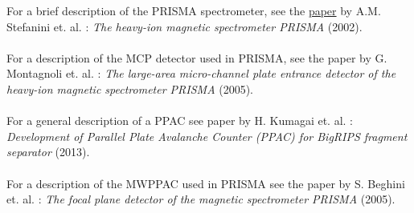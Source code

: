 \documentclass{article}
\begin{document}
For a brief description of the PRISMA spectrometer, see the \href{https://pdf.sciencedirectassets.com/271584/1-s2.0-S0375947400X03144/1-s2.0-S0375947401015780/main.pdf?X-Amz-Security-Token=IQoJb3JpZ2luX2VjEBUaCXVzLWVhc3QtMSJIMEYCIQCRHpLF752rX6FV98MG74Br%2FOwOBcpX6yD1ddcGS8dSogIhALw%2BCaK68OE4q%2F6Cdxw0tkpWl%2Bi4lobnjDAMbgD3WJloKrIFCC0QBRoMMDU5MDAzNTQ2ODY1IgwMev7XIuiKrEucM2sqjwWtmOVcx3R3%2Fmi1N0QLMzkty6y2NG4iTH21bMxPIwZ8bQsn8Kg3vHjRCiynMJC%2FlktTnzFi2XkxrC%2FoK4kKi%2B8iimicv2aD8Nizb2825kJ%2FRqL1m1CyxalJMwzkDry9N5s67QGkkBBkVpwSGUaqE9ItwMX9RaUYB8rbZ4XGQgEbEEu0ieJJsUB4r719gHyZT6a2tcA7tPByMY4yMQdYSN%2BLrS6zSPIlUyVI5xwpp6IhuzKl%2BAbTeT6MMobR4USSvpO%2F0%2B9YpoSX%2FPILnulAL%2BEsYUV5nnY0UikYVkB%2FqUPnuFdt0bYK7prGjl8hrlFYOe%2BEJAVweOPBvdNjb%2FevxjTkPbvHhbeIGwQr0UWRC490vEDlzcIyLTqbhdrktht9DyDgGyydHMcLBgPuKk321kQxElTUijRAq5cl690oxyiaUEAW1DqwuwTVrVn56VGNOgTP6Tg8S7UG1Xsq0cEgz8dGb%2FGoZxtboOTgIzU%2FUu2Fgd5c6yfxdH2R8E0gjw1wPRv08lcaxfDL4S6rQRE4PkDSoybPDlxQeOEnlgud1vEfQ0Q1%2BzXoMyX2lSVbcS%2BmIyILmRk1f2Q05tYbufg6wGWfHSuWsLw8sOQlAGYYItykkc0OuMKu7ljApViwZcxnK5TeHn9JUN6w1TPzD2yvjxGZvvvUNhjb1%2BGWOwVPTr2XInX3RVQ8TemjoR%2FpmnOUwujD7THjlAjoTGUKzBI8Zb27vahSWoXKNu9J3n6DuvJ8WzrRTwnVtasxmPX50%2FGHUu7sIF1jXeYDiBiBbohTO%2FU7mddA3iK6GXTZXzMUo9AVuC8agGHRfIKiwBCwX3WzQ%2Ba03XCQ4ZiiCfjGsNIizmDUEIpcuCpxp0DntsjbKxRSMN%2BMiL0GOrAB%2Fm%2BcgaLg9cWzCaB7oMuYF7AhoIX569krU7XbygoyOo1KAZnBHXgaKhUQn%2BO9d6Y5fMmHUvRYIx36AqFijMNCGNIWpD6Gd06up%2BGh5Oc95Dn9L2k8UdLL96eJgqI%2F%2FZXyV8mbpQxIqqHX1RiUL%2BdH3DNKrrPyn%2BpN9gVNkIa3HX9PDOnv1pv9opm7Wz4jyx0Y3nt4zbPnGEBqnrUQrqleQGiMRPIoLRGT4XnjVmN%2BVmI%3D&X-Amz-Algorithm=AWS4-HMAC-SHA256&X-Amz-Date=20250204T130706Z&X-Amz-SignedHeaders=host&X-Amz-Expires=300&X-Amz-Credential=ASIAQ3PHCVTY2FN4ZH4P%2F20250204%2Fus-east-1%2Fs3%2Faws4_request&X-Amz-Signature=79810e05c70bf1c1a28563b200485d51f810717edb408ff044b416d19e27978f&hash=18f98c862de144d3d593c67ea9d2b62f84c7ea14942adcab9a479c72e21c7406&host=68042c943591013ac2b2430a89b270f6af2c76d8dfd086a07176afe7c76c2c61&pii=S0375947401015780&tid=spdf-bd4de81f-7ec8-41c9-8c4e-84fa18b7c8a3&sid=18e2e20d8a387447448b02b82a5197057117gxrqb&type=client&tsoh=d3d3LnNjaWVuY2VkaXJlY3QuY29t&ua=14095e500601015e075808&rr=90cae1b9fcf15f0a&cc=no}{paper} by A.M. Stefanini et. al. : \emph{The heavy-ion magnetic spectrometer PRISMA} (2002). \\\\
For a description of the MCP detector used in PRISMA, see the paper by G. Montagnoli et. al. : \emph{The large-area micro-channel plate entrance detector of the heavy-ion magnetic spectrometer PRISMA} (2005).\\\\
For a general description of a PPAC see paper by H. Kumagai et. al. : \emph{Development of Parallel Plate Avalanche Counter (PPAC) for BigRIPS fragment separator} (2013).\\\\
For a description of the MWPPAC used in PRISMA see the paper by S. Beghini et. al. : \emph{The focal plane detector of the magnetic spectrometer PRISMA} (2005).
\end{document}
